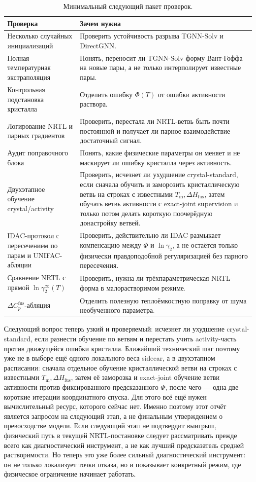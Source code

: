 \documentclass[11pt]{article}
\newcommand{\Tm}{T_{\mathrm m}}
\newcommand{\dHfus}{\Delta H_{\mathrm{fus}}}
\theoremstyle{definition}
\begin{document}
\begin{table}[!htbp]
\centering
\caption{Минимальный следующий пакет проверок.}
\small
\begin{tabularx}{\textwidth}{P{0.30\textwidth}Y}
\toprule
Проверка & Зачем нужна \\
\midrule
Несколько случайных инициализаций & Проверить устойчивость разрыва TGNN-Solv и DirectGNN. \\
Полная температурная экстраполяция & Понять, переносит ли TGNN-Solv форму Вант-Гоффа на новые пары, а не только интерполирует известные пары. \\
Контрольная подстановка кристалла & Отделить ошибку $\Phi(T)$ от ошибки активности раствора. \\
Логирование NRTL и парных градиентов & Проверить, перестала ли NRTL-ветвь быть почти постоянной и получает ли парное взаимодействие достаточный сигнал. \\
Аудит поправочного блока & Понять, какие физические параметры он меняет и не маскирует ли ошибку кристалла через активность. \\
Двухэтапное обучение crystal/activity & Проверить, исчезнет ли ухудшение crystal-standard, если сначала обучить и заморозить кристаллическую ветвь на строках с известными $\Tm,\dHfus$, затем обучать ветвь активности с exact-joint supervision и только потом делать короткую поочерёдную донастройку ветвей. \\
IDAC-протокол с пересечением по парам и UNIFAC-абляции & Проверить, действительно ли IDAC размыкает компенсацию между $\Phi$ и $\ln\gamma_2$, а не остаётся только физически правдоподобной регуляризацией без парного пересечения. \\
Сравнение NRTL с прямой $\ln\gamma_2^\infty(T)$ & Проверить, нужна ли трёхпараметрическая NRTL-форма в малорастворимом режиме. \\
\(\Delta C_p^{\mathrm{fus}}\)-абляция & Отделить полезную теплоёмкостную поправку от шума необученного параметра. \\
\bottomrule
\end{tabularx}
\end{table}

Следующий вопрос теперь узкий и проверяемый: исчезнет ли ухудшение crystal-standard, если разнести обучение по ветвям и перестать учить activity-часть против движущейся ошибки кристалла. Ближайший технический шаг поэтому уже не в выборе ещё одного локального веса sidecar, а в двухэтапном расписании: сначала отдельное обучение кристаллической ветви на строках с известными $\Tm,\dHfus$, затем её заморозка и exact-joint обучение ветви активности против фиксированного предсказанного $\Phi$, после чего --- одна-две короткие итерации координатного спуска. Для этого всё ещё нужен вычислительный ресурс, которого сейчас нет. Именно поэтому этот отчёт является запросом на следующий этап, а не финальным утверждением о превосходстве модели. Если следующий этап не подтвердит выигрыш, физический путь в текущей NRTL-постановке следует рассматривать прежде всего как диагностический инструмент, а не как лучший предсказатель средней растворимости. Но теперь это уже более сильный диагностический инструмент: он не только локализует точки отказа, но и показывает конкретный режим, где физическое ограничение начинает работать.
\end{document}
